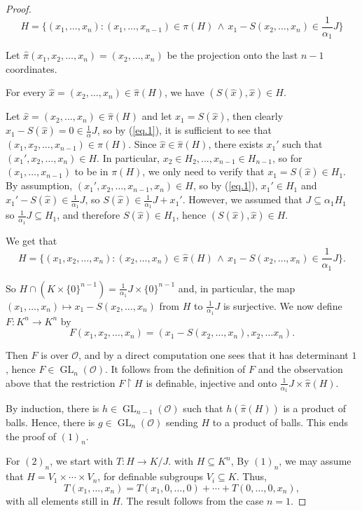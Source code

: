 \documentclass[10pt,a4paper]{amsart}
\DeclareMathOperator{\gl}{GL} \DeclareMathOperator{\agl}{AGL}
\def\sub{\subseteq}
\newcommand{\CO}{{\mathcal O}}
\begin{document}
\begin{proof}
\begin{equation}\label{eq.1}H=\{(x_1,\ldots, x_n): (x_1,\ldots, x_{n-1})\in \pi(H)\,\wedge \, x_1
-S(x_2,\ldots, x_n) \in \frac{1}{\alpha_1}J\}\end{equation}

Let $\hat \pi(x_1,x_2,\ldots, x_n)=(x_2,\ldots, x_n)$ be the projection onto the last $n-1$ coordinates. 
\begin{claim}\label{claim1}
    For every $\hat x=(x_2,\ldots, x_n)\in \hat \pi (H)$, we have $(S(\hat x),\hat x)\in H$.
\end{claim}
\begin{claimproof}
    Let $\hat x=(x_2,\dots,x_n)\in \hat \pi(H)$ and let $x_1=S(\hat x)$, then clearly $x_1-S(\hat x)=0\in \frac{1}{\alpha}J$, so by (\ref{eq.1}), it is sufficient to see that $(x_1,x_2,\ldots, x_{n-1})\in \pi(H)$. Since $\hat x\in \hat \pi(H)$,  there exists $x_1'$ such that $(x_1',x_2,\ldots, x_n)\in H$. In particular, $x_2\in H_2,\ldots, x_{n-1}\in H_{n-1}$, so for $(x_1,\ldots, x_{n-1})$ to be in $\pi(H)$, we only need to verify that $x_1=S(\hat x)\in H_1$. By assumption, $(x_1',x_2,\ldots, x_{n-1}, x_{n})\in H$, so by (\ref{eq.1}), $x_1'\in H_1$ and 
$x_1'-S(\hat x)\in \frac{1}{\alpha_1} J$, so $S(\hat x)\in \frac{1}{\alpha_1}J+x_1'$. However, we assumed that  $J\sub \alpha_1 H_1$ so $\frac{1}{\alpha_1}J\sub H_1$, and therefore $S(\hat x)\in H_1$, hence $(S(\hat x),\hat x)\in H$. 
\end{claimproof}

We get that 
\[H=\{(x_1,x_2,\ldots, x_n):(x_2,\ldots, x_n)\in \hat \pi(H) \,\wedge\, x_1-S(x_2,\ldots, x_n)\in \frac{1}{\alpha_1}J\}.\]


So $H\cap (K\times  \{0\}^{n-1})=\frac{1}{\alpha_1}J\times \{0\}^{n-1}$ and, in particular, the  map $(x_1,\dots, x_n)\mapsto x_1-S(x_2,\dots, x_n)$ from $H$ to $\frac{1}{\alpha_1}J$ is surjective. 
We now define $F:K^n\to K^n$ by \[F(x_1,x_2,\ldots, x_n)=(x_1-S(x_2,\ldots, x_n),x_2, \ldots x_n).\]

Then $F$ is over $\CO$, and by a direct computation one sees that it has determinant $1$, hence $F\in \gl_n(\CO)$. It follows from the definition of $F$ and the observation above that the restriction $F\restriction H$ is definable, injective and onto $\frac{1}{\alpha_1}J\times \hat \pi(H)$. 


By induction, there is $h\in \gl_{n-1}(\CO)$ such that $h(\hat \pi (H))$ is a product of balls. Hence, there is $g\in \gl_n(\CO)$ sending $H$ to a product of balls. This ends the proof of $(1)_n$. 

For $(2)_n$, we start with $T:H\to K/J$. with $H\subseteq K^n$, By $(1)_n$, we may assume that $H=V_1\times \cdots \times V_n$, for definable subgroups $V_i\subseteq K$. Thus, 
\[T(x_1,\ldots, x_n)=T(x_1,0,\ldots, 0)+\cdots +T(0,\ldots, 0,x_n),\] with all elements still in $H$. The result follows from  the case $n=1$.
\end{proof}
\end{document}

